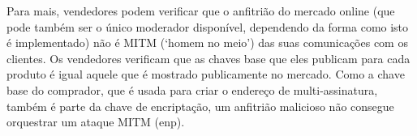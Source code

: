 Para mais, vendedores podem verificar que o anfitrião do mercado online (que pode também ser o único moderador disponível, dependendo da forma como isto é implementado) não é MITM (`homem no meio') das suas comunicações com os clientes. Os vendedores verificam que as chaves base que eles publicam para cada produto é igual aquele que é mostrado publicamente no mercado. Como a chave base do comprador, que é usada para criar o endereço de multi-assinatura, também é parte da chave de encriptação, um anfitrião malicioso não consegue orquestrar um ataque MITM (enp).
  

